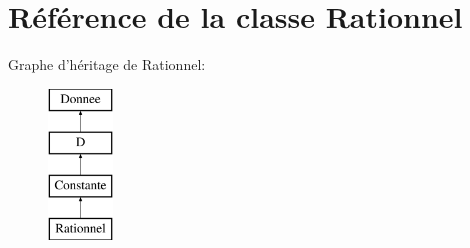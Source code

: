 \hypertarget{class_rationnel}{\section{Référence de la classe Rationnel}
\label{class_rationnel}
}
Graphe d'héritage de Rationnel\-:\begin{figure}[H]
\begin{center}
\leavevmode
\includegraphics[height=4.000000cm]{class_rationnel}
\end{center}
\end{figure}
